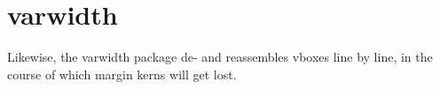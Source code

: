 \documentclass[varwidth=5.5cm,border=1cm]{standalone}
\begin{document}
\section{varwidth}

Likewise, the varwidth package de- and reassembles vboxes line by line, in the course of which margin kerns will get lost.
\end{document}
